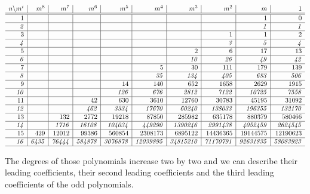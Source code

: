 \documentclass[preprint,authoryear]{elsarticle}
\begin{document}
\begin{tiny}
  \begin{displaymath}
    \begin{array}{r|r| r | r | r | r| r | r| r | r}
      n\backslash m^i & m^8 & m^7 & m^6 & m^5 & m^4 & m^3 & m^2 & m & 1\\
      \hline\hline
      1 &&&&&&&& 1 & 0\\
      \hline
     \mathit{ 2} &&&&&&&& \mathit{1} & \mathit{1} \\
      \hline
      3 && &&&&&1 & 1 &2 \\
      \hline
      \mathit{4} &&&&&&&\mathit{3} &\mathit{5} &\mathit{4}  \\
      \hline
      5 && &&&&2& 6&17&13\\
      \hline
      \mathit{6} && &&&&\mathit{10} & \mathit{26}&\mathit{49} & \mathit{42}\\
      \hline
      7 &&&&& 5 & 30 & 111&179&139\\
      \hline
      \mathit{8}  &&&&& \mathit{35}  & \mathit{134} & \mathit{405}&\mathit{683} & \mathit{506}\\
      \hline
      9 &&&& 14 &140 &652 &1658 &2629 &1915\\
      \hline
      \mathit{10} &&&& \mathit{126} &\mathit{676} &\mathit{2812} &\mathit{7122} &\mathit{10725} &\mathit{7558}\\
      \hline
      11&&& 42 &630 &3610 &12760 &30783 &45195 &31092\\
      \hline
      \mathit{12} &&& \mathit{462} &\mathit{3334} &\mathit{17670} &\mathit{60240} &\mathit{138033} &\mathit{196355} &\mathit{132170}\\
      \hline
      13 && 132 &2772 &19218 &87850 &285982 &635178 &880379 &580466\\
      \hline
      \mathit{14} && \mathit{1716} &\mathit{16108} &\mathit{104034} &\mathit{449290} &\mathit{1390246} &\mathit{2991438} &\mathit{4052459} & \mathit{2624545}\\ 
      \hline
      15 & 429 &12012 &99386 &560854 &2308173&6895122 &14436365 &19144575 &12190623\\
      \hline
      \mathit{16} & \mathit{6435} &\mathit{76444}&\mathit{584878}&\mathit{3076878} &\mathit{12039895}&\mathit{34815210} &\mathit{71170791}&\mathit{92631835} &\mathit{58083923}\\
      \hline
    \end{array}
  \end{displaymath}
\end{tiny}
The degrees of those polynomials
increase two by two and we can describe their leading coefficients,  their second leading
coefficients and the third leading coefficients of the odd polynomials.
\end{document}
